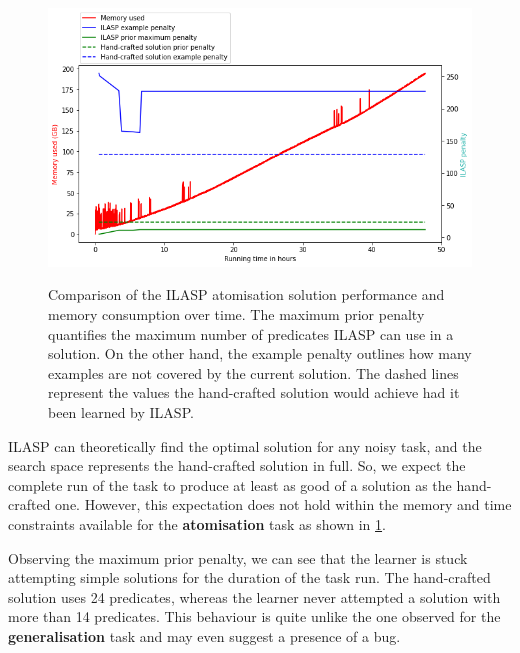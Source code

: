 
\begin{figure}[h]
\caption{Comparison of the ILASP atomisation solution performance and memory consumption over time. The maximum prior penalty quantifies the maximum number of predicates ILASP can use in a solution. On the other hand, the example penalty outlines how many examples are not covered by the current solution. The dashed lines represent the values the hand-crafted solution would achieve had it been learned by ILASP.}
\centering
\includegraphics[width=\textwidth]{solving-nlp-tasks-logically/atomisation_memory_vs_best_score.png}
\label{atomisation-memory-graph}
\end{figure}

ILASP can theoretically find the optimal solution for any noisy task, and the search space represents the hand-crafted solution in full. 
So, we expect the complete run of the task to produce at least as good of a solution as the hand-crafted one.
However, this expectation does not hold within the memory and time constraints available for the \textbf{atomisation} task as shown in \ref{atomisation-memory-graph}.

Observing the maximum prior penalty, we can see that the learner is stuck attempting simple solutions for the duration of the task run. 
The hand-crafted solution uses 24 predicates, whereas the learner never attempted a solution with more than 14 predicates.
This behaviour is quite unlike the one observed for the \textbf{generalisation} task and may even suggest a presence of a bug.

